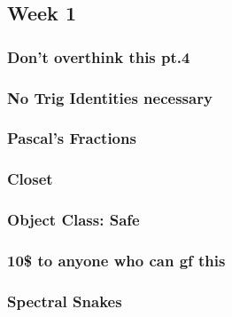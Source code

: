 \documentclass[titlepage=true]{scrartcl}
\begin{document}
{{{    
    \subsection{Week 1}

    \subsubsection{Don't overthink this pt.4}
    \label{22.1.1}
    
    \newpage

    \subsubsection{No Trig Identities necessary}
    \label{22.1.2}
    
    \newpage

    \subsubsection{Pascal's Fractions}
    \label{22.1.3}
    
    \newpage

    \subsubsection{Closet}
    \label{22.1.4}
    
    \newpage
    
    \subsubsection{Object Class: Safe}
    \label{22.1.5}
    
    \newpage

    \subsubsection{10\$ to anyone who can gf this}
    \label{22.1.6}
    
    \newpage

    \subsubsection{Spectral Snakes}
    \label{22.1.7}
    
    \newpage
    

}}}
\end{document}

